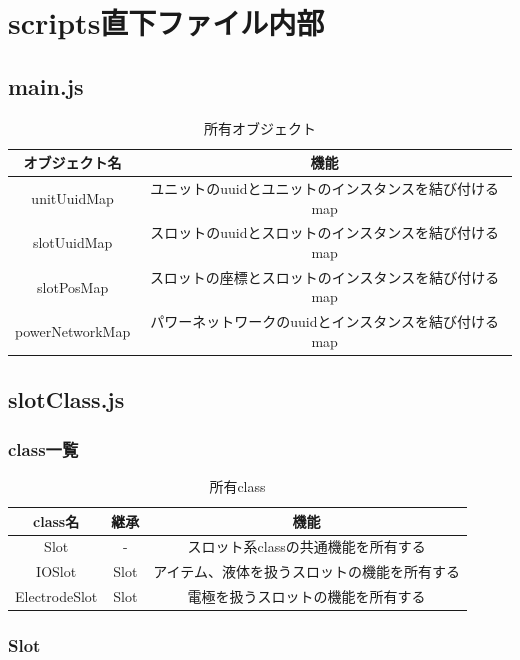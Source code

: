 \documentclass[uplatex,dvipdfmx,report]{jlreq}
\begin{document}
\chapter{scripts直下ファイル内部}

\section{main.js}

\begin{table}[H]
    \centering
    \caption{所有オブジェクト}
    \begin{tabular}{cc}
        \hline
        オブジェクト名 & 機能 \\
        \hline
        \hline
        unitUuidMap & ユニットのuuidとユニットのインスタンスを結び付けるmap \\
        slotUuidMap & スロットのuuidとスロットのインスタンスを結び付けるmap \\
        slotPosMap & スロットの座標とスロットのインスタンスを結び付けるmap \\
        powerNetworkMap & パワーネットワークのuuidとインスタンスを結び付けるmap \\
        \hline
    \end{tabular}
\end{table}

\section{slotClass.js}

\subsection{class一覧}
\begin{table}[H]
    \centering
    \caption{所有class}
    \begin{tabular}{ccc}
        \hline
        class名 & 継承 & 機能 \\
        \hline
        \hline
        Slot & - & スロット系classの共通機能を所有する \\
        IOSlot & Slot & アイテム、液体を扱うスロットの機能を所有する \\
        ElectrodeSlot & Slot & 電極を扱うスロットの機能を所有する \\
        \hline
    \end{tabular}
\end{table}

\subsection{Slot}
\end{document}
